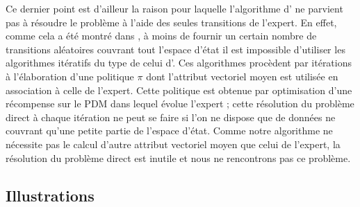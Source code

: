 \documentclass{article}
\begin{document}
 Ce dernier point est d'ailleur la raison pour laquelle l'algorithme d'\citet{abbeel2004apprenticeship} ne parvient pas à résoudre le problème à l'aide des seules transitions de l'expert.
En effet, comme cela a été montré dans \citep{klein2011batch}, à moins de fournir un certain nombre de transitions aléatoires couvrant tout l'espace d'état il est impossible d'utiliser les algorithmes itératifs du type de celui d'\citet{abbeel2004apprenticeship}. Ces algorithmes procèdent par itérations à l'élaboration d'une politique $\pi$ dont l'attribut vectoriel moyen est utilisée en association à celle de l'expert. Cette politique est obtenue par optimisation d'une récompense sur le PDM dans lequel évolue l'expert ; cette résolution du problème direct à chaque itération ne peut se faire si l'on ne dispose que de données ne couvrant qu'une petite partie de l'espace d'état. Comme notre algorithme ne nécessite pas le calcul d'autre attribut vectoriel moyen que celui de l'expert, la résolution du problème direct est inutile et nous ne rencontrons pas ce problème.
\subsection{Illustrations}
\end{document}
